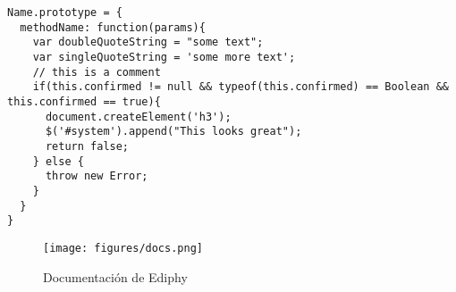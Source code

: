 \begin{lstlisting} 
Name.prototype = {
  methodName: function(params){
    var doubleQuoteString = "some text";
    var singleQuoteString = 'some more text';
    // this is a comment
    if(this.confirmed != null && typeof(this.confirmed) == Boolean && this.confirmed == true){
      document.createElement('h3');
      $('#system').append("This looks great");
      return false;
    } else {
      throw new Error;
    }
  }
}
\end{lstlisting}
\begin{figure}[H]
\centering
\texttt{[image: figures/docs.png]}
\caption{Documentación de Ediphy}

\end{figure}
